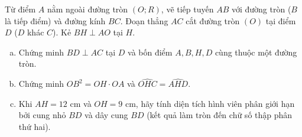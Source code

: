 \begin{bt}%
Từ điểm $A$ nằm ngoài đường tròn $(O; R)$, vẽ tiếp tuyến $AB$ với đường tròn ($B$ là tiếp điểm) và đường kính $BC$. Đoạn thẳng $AC$ cắt đường tròn $(O)$ tại điểm $D$ ($D$ khác $C$). Kẻ $BH \perp AO$ tại $H$.
\begin{enumerate}[a)]
	\item Chứng minh $BD \perp AC$ tại $D$ và bốn điểm $A, B, H, D$ cùng thuộc một đường tròn.
	\item Chứng minh $OB^2 = OH \cdot OA$ và $\widehat{OHC} = \widehat{AHD}$.
	\item Khi $AH = 12\text{ cm}$ và $OH = 9\text{ cm}$, hãy tính diện tích hình viên phân giới hạn bởi cung nhỏ $BD$ và dây cung $BD$ (kết quả làm tròn đến chữ số thập phân thứ hai).
\end{enumerate}
\end{bt}
